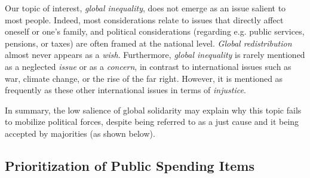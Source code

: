 \documentclass[12pt,english]{article}
\begin{document}
\begin{bibunit}
Our topic of interest, \textit{global inequality}, does not emerge as an issue salient to most people. Indeed, most considerations relate to issues that directly affect oneself or one's family, and political considerations (regarding e.g. public services, pensions, or taxes) are often framed at the national level. \textit{Global redistribution} almost never appears as a \textit{wish}. Furthermore, \textit{global inequality} is rarely mentioned as a neglected \textit{issue} or as a \textit{concern}, in contrast to international issues such as war, climate change, or the rise of the far right. However, it is mentioned as frequently as these other international issues in terms of \textit{injustice}. 

In summary, the low salience of global solidarity may explain why this topic fails to mobilize political forces, despite being referred to as a just cause and it being accepted by majorities (as shown below). 

\subsection{Prioritization of Public Spending Items}\label{subsec:revenue_split}


\end{bibunit}
\end{document}
